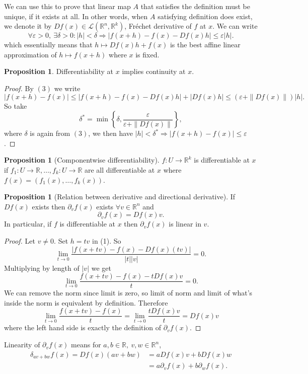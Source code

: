\documentclass[a4paper]{article}
\theoremstyle{definition}
\newtheorem{prop}[defn]{Proposition}
\begin{document}
We can use this to prove that linear map $A$ that satisfies the definition must be unique, if it exists at all. In other words, when $A$ satisfying definition does exist, we denote it by $D f(x)\in \mathcal L (\mathbb R^n,\mathbb R^k)$, Fréchet derivative of $f$ at $x$. We can write \begin{equation}\forall \varepsilon>0,\ \exists \delta>0 : |h|<\delta \Rightarrow |f(x+h)-f(x)-Df(x)h| \leq \varepsilon |h|.\end{equation} which essentially means that $h\mapsto Df(x)h+f(x)$ is the best affine linear approximation of $h\mapsto f(x+h)$ where $x$ is fixed.

\begin{prop}
Differentiability at $x$ implies continuity at $x$.
\end{prop}
\begin{proof}
By $(3)$ we write
\[
|f(x+h)-f(x)|\leq |f(x+h)-f(x)-Df(x)h|+|Df(x)h|\leq (\varepsilon+ \|Df(x)\|)|h| .
\]
So take
\[
\delta^\ast=\min \left\{\delta,\frac{\varepsilon}{\varepsilon+\|Df(x)\|}\right\},
\]
where $\delta$ is again from $(3)$, we then have $|h|<\delta^\ast \Rightarrow |f(x+h)-f(x)|\leq \varepsilon$.
\end{proof}

\begin{prop}[Componentwise differentiability]
$f:U\rightarrow \mathbb R^k$ is differentiable at $x$ if $f_1:U\rightarrow \mathbb R,\ldots,f_k:U\rightarrow \mathbb R$ are all differentiable at $x$ where $f(x)=(f_1(x),\ldots,f_k(x))$.
\end{prop}

\begin{prop}[Relation between derivative and directional derivative]
If $Df(x)$ exists then $\partial_v f(x)$ exists $\forall v\in \mathbb R^n$ and
\[
\partial_v f(x)=Df(x)v .
\]
In particular, if $f$ is differentiable at $x$ then $\partial_v f(x)$ is linear in $v$.
\end{prop}
\begin{proof}
Let $v\neq 0$. Set $h=tv$ in (1). So
\[
\lim_{t\rightarrow 0}\frac{|f(x+tv)-f(x)-Df(x)(tv)|}{|t||v|}=0.
\]
Multiplying by length of $|v|$ we get
\[
\lim_{t\rightarrow 0}\frac{f(x+tv)-f(x)-tDf(x)v}{t}=0.
\]
We can remove the norm since limit is zero, so limit of norm and limit of what's inside the norm is equivalent by definition. Therefore
\[
\lim_{t\rightarrow 0} \frac{f(x+tv)-f(x)}{t}=\lim_{t\rightarrow 0}\frac{tDf(x)v}{t}=Df(x)v
\]
where the left hand side is exactly the definition of $\partial_vf(x).$
\end{proof}
Linearity of $\partial_v f(x)$ means for $a,b\in \mathbb R,\ v,w\in \mathbb R^n$,
\[
\begin{aligned}\delta_{av+bw}f(x)=Df(x)(av+bw)&=aDf(x)v+bDf(x)w\\&=a\partial_v f(x)+b\partial_w f(x).\end{aligned}
\]
\end{document}
